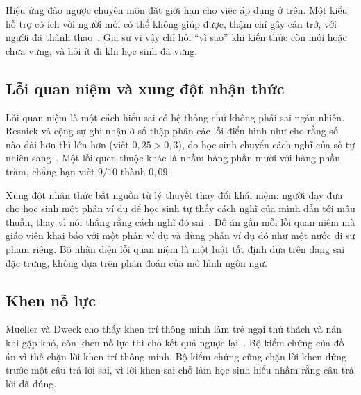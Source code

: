 Hiệu ứng đảo ngược chuyên môn đặt giới hạn cho việc áp dụng ở trên. Một kiểu hỗ trợ có ích với người mới có thể không giúp được, thậm chí gây cản trở, với người đã thành thạo~\cite{kalyuga2003}. Gia sư vì vậy chỉ hỏi ``vì sao'' khi kiến thức còn mới hoặc chưa vững, và hỏi ít đi khi học sinh đã vững.

\subsection{Lỗi quan niệm và xung đột nhận thức}
Lỗi quan niệm là một cách hiểu sai có hệ thống chứ không phải sai ngẫu nhiên. Resnick và cộng sự ghi nhận ở số thập phân các lỗi điển hình như cho rằng số nào dài hơn thì lớn hơn (viết $0{,}25>0{,}3$), do học sinh chuyển cách nghĩ của số tự nhiên sang~\cite{resnick1989}. Một lỗi quen thuộc khác là nhầm hàng phần mười với hàng phần trăm, chẳng hạn viết $9/10$ thành $0{,}09$.

Xung đột nhận thức bắt nguồn từ lý thuyết thay đổi khái niệm: người dạy đưa cho học sinh một phản ví dụ để học sinh tự thấy cách nghĩ của mình dẫn tới mâu thuẫn, thay vì nói thẳng rằng cách nghĩ đó sai~\cite{posner1982}. Đồ án gắn mỗi lỗi quan niệm mà giáo viên khai báo với một phản ví dụ và dùng phản ví dụ đó như một nước đi sư phạm riêng. Bộ nhận diện lỗi quan niệm là một luật tất định dựa trên dạng sai đặc trưng, không dựa trên phán đoán của mô hình ngôn ngữ.

\subsection{Khen nỗ lực}
Mueller và Dweck cho thấy khen trí thông minh làm trẻ ngại thử thách và nản khi gặp khó, còn khen nỗ lực thì cho kết quả ngược lại~\cite{mueller1998}. Bộ kiểm chứng của đồ án vì thế chặn lời khen trí thông minh. Bộ kiểm chứng cũng chặn lời khen đứng trước một câu trả lời sai, vì lời khen sai chỗ làm học sinh hiểu nhầm rằng câu trả lời đã đúng.
